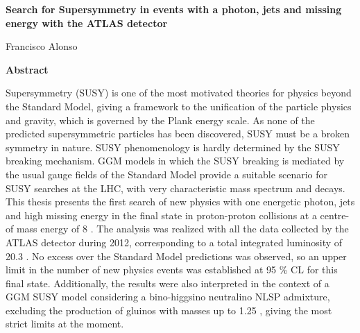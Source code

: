 \thispagestyle{plain}
\begin{center}
  \Large
  \textbf{Search for Supersymmetry in events with a photon, jets and
    missing energy with the ATLAS detector}

  \vspace{0.4cm}
  \large

  \vspace{0.4cm}
  Francisco Alonso

  \vspace{2cm}
  \textbf{Abstract}
\end{center}

Supersymmetry (SUSY) is one of the most motivated theories for physics beyond
the Standard Model, giving a framework to the unification of the particle
physics and gravity, which is governed by the Plank energy scale. As none of
the predicted supersymmetric particles has been discovered, SUSY must be a
broken symmetry in nature. SUSY phenomenology is hardly determined by the SUSY
breaking mechanism. GGM models in which the SUSY breaking is mediated by the
usual gauge fields of the Standard Model provide a suitable scenario for SUSY
searches at the LHC, with very characteristic mass spectrum and decays. This
thesis presents the first search of new physics with one energetic photon, jets
and high missing energy in the final state in proton-proton collisions at a
centre-of mass energy of 8 {\tev}. The analysis was realized with all the data
collected by the ATLAS detector during 2012, corresponding to a total
integrated luminosity of 20.3 \ifb. No excess over the Standard Model
predictions was observed, so an upper limit in the number of new physics events
was established at 95 \% CL for this final state. Additionally, the results were
also interpreted in the context of a GGM SUSY model considering a bino-higgsino
neutralino NLSP admixture, excluding the production of gluinos with masses up to
1.25 \tev, giving the most strict limits at the moment.
